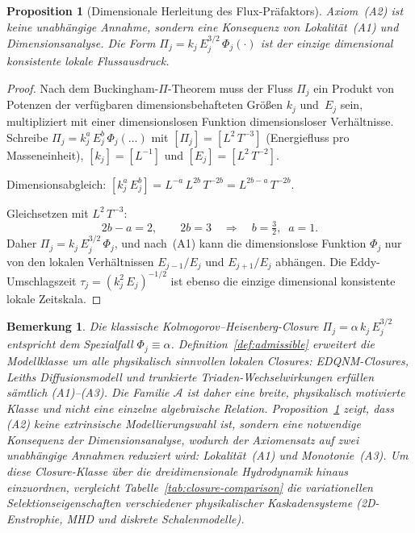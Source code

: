 \documentclass[12pt,a4paper]{article}
\theoremstyle{breakdef}
\theoremstyle{breakplain}
\newtheorem{proposition}[definition]{Proposition}
\theoremstyle{breakdef}
\newtheorem{remark}[definition]{Bemerkung}
\begin{document}
\begin{proposition}[Dimensionale Herleitung des Flux-Präfaktors]\label{prop:A2-derived}
Axiom~\textup{(A2)} ist keine unabhängige Annahme, sondern eine Konsequenz von Lokalität~\textup{(A1)} und Dimensionsanalyse. Die Form $\Pi_j = k_j\,E_j^{3/2}\,\Phi_j(\cdot)$ ist der \emph{einzige} dimensional konsistente lokale Flussausdruck.
\end{proposition}

\begin{proof}
Nach dem Buckingham-$\Pi$-Theorem muss der Fluss $\Pi_j$ ein Produkt von Potenzen der verfügbaren dimensionsbehafteten Größen $k_j$ und~$E_j$ sein, multipliziert mit einer dimensionslosen Funktion dimensionsloser Verhältnisse. Schreibe $\Pi_j = k_j^{a}\,E_j^{b}\,\Phi_j(\ldots)$ mit $[\Pi_j] = [L^2\,T^{-3}]$ (Energiefluss pro Masseneinheit), $[k_j] = [L^{-1}]$ und $[E_j] = [L^2\,T^{-2}]$.

Dimensionsabgleich: $[k_j^a\,E_j^b] = L^{-a}\,L^{2b}\,T^{-2b} = L^{2b-a}\,T^{-2b}$.

Gleichsetzen mit $L^2\,T^{-3}$:
\[
2b - a = 2, \qquad 2b = 3 \quad\Longrightarrow\quad b = \tfrac{3}{2},\;\; a = 1.
\]
Daher $\Pi_j = k_j\,E_j^{3/2}\,\Phi_j$, und nach~(A1) kann die dimensionslose Funktion $\Phi_j$ nur von den lokalen Verhältnissen $E_{j-1}/E_j$ und $E_{j+1}/E_j$ abhängen. Die Eddy-Umschlagszeit $\tau_j = (k_j^2\,E_j)^{-1/2}$ ist ebenso die einzige dimensional konsistente lokale Zeitskala.
\end{proof}

\begin{remark}
Die klassische Kolmogorov--Heisenberg-Closure $\Pi_j = \alpha\,k_j\,E_j^{3/2}$
entspricht dem Spezialfall $\Phi_j \equiv \alpha$. Definition~\ref{def:admissible}
erweitert die Modellklasse um alle physikalisch sinnvollen lokalen Closures:
EDQNM-Closures, Leiths Diffusionsmodell und trunkierte Triaden-Wechselwirkungen
erfüllen sämtlich (A1)--(A3). Die Familie $\mathscr{A}$ ist daher eine breite,
physikalisch motivierte Klasse und nicht eine einzelne algebraische Relation.
Proposition~\ref{prop:A2-derived} zeigt, dass (A2) keine extrinsische
Modellierungswahl ist, sondern eine notwendige Konsequenz der Dimensionsanalyse,
wodurch der Axiomensatz auf zwei unabhängige Annahmen reduziert wird: Lokalität~(A1) und Monotonie~(A3). Um diese Closure-Klasse über die dreidimensionale Hydrodynamik hinaus einzuordnen, vergleicht Tabelle~\ref{tab:closure-comparison} die variationellen Selektionseigenschaften verschiedener physikalischer Kaskadensysteme (2D-Enstrophie, MHD und diskrete Schalenmodelle).
\end{remark}
\end{document}
